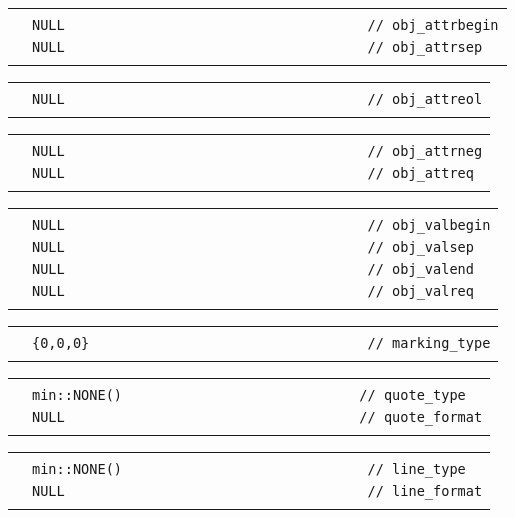 \documentclass[12pt]{article}
\newenvironment{indpar}[1][0.3in]%
	{\begin{list}{}%
		     {\setlength{\itemsep}{0in}%
		      \setlength{\topsep}{0in}%
		      \setlength{\parsep}{1ex}%
		      \setlength{\labelwidth}{#1}%
		      \setlength{\leftmargin}{#1}%
		      \addtolength{\leftmargin}{\labelsep}}%
	 \item}%
	{\end{list}}
\newlength{\ARGBREAKLENGTH}
\newcommand{\ARGBREAK}[1][\ARGBREAKLENGTH]{\\&\hspace*{#1}}
\begin{document}
\begin{indpar}[1em]
\vspace{-4ex}\begin{tabular}{r@{}l}\hspace*{0.1in}\ARGBREAK
\verb|NULL                                     // obj_attrbegin|\ARGBREAK
\verb|NULL                                     // obj_attrsep|\ARGBREAK
\end{tabular}

\vspace{-4ex}\begin{tabular}{r@{}l}\hspace*{0.1in}\ARGBREAK
\verb|NULL                                     // obj_attreol|\ARGBREAK
\end{tabular}

\vspace{-4ex}\begin{tabular}{r@{}l}\hspace*{0.1in}\ARGBREAK
\verb|NULL                                     // obj_attrneg|\ARGBREAK
\verb|NULL                                     // obj_attreq|\ARGBREAK
\end{tabular}

\vspace{-4ex}\begin{tabular}{r@{}l}\hspace*{0.1in}\ARGBREAK
\verb|NULL                                     // obj_valbegin|\ARGBREAK
\verb|NULL                                     // obj_valsep|\ARGBREAK
\verb|NULL                                     // obj_valend|\ARGBREAK
\verb|NULL                                     // obj_valreq|\ARGBREAK
\end{tabular}

\vspace{-4ex}\begin{tabular}{r@{}l}\hspace*{0.1in}\ARGBREAK
\verb|{0,0,0}                                  // marking_type|\ARGBREAK
\end{tabular}

\vspace{-4ex}\begin{tabular}{r@{}l}\hspace*{0.1in}\ARGBREAK
\verb|min::NONE()                             // quote_type|\ARGBREAK
\verb|NULL                                    // quote_format|\ARGBREAK
\end{tabular}

\vspace{-4ex}\begin{tabular}{r@{}l}\hspace*{0.1in}\ARGBREAK
\verb|min::NONE()                              // line_type|\ARGBREAK
\verb|NULL                                     // line_format|\ARGBREAK
\end{tabular}


\end{indpar}
\end{document}
